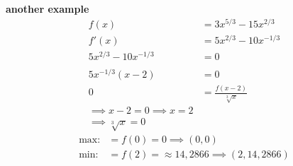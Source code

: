 \documentclass{report}
\begin{document}
\begin{multicols}{2}
\textbf{another example}\\
\begin{align*}
  f(x)&=3x^{5/3}-15x^{2/3}\\ 
  f'(x)&=5x^{2/3}-10x^{-1/3}\\
  5x^{2/3}-10x^{-1/3}&=0\\\\
  5x^{-1/3}(x-2)&=0\\
  0&=\frac{f(x-2)}{\sqrt[3]{x}}\\
  \implies x-2=0 \implies x=2\\
  \implies \sqrt[3]{x}=0
\end{align*}
\begin{align*}
  \text{max:} &=f(0)=0 \implies (0,0)\\
  \text{min:} &=f(2)=\approx 14,2866 \implies (2,14,2866)\\
\end{align*}
\end{multicols}
\end{document}
